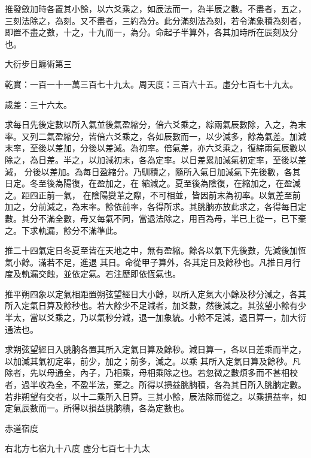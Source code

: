 \begin{pinyinscope}
 推發斂加時各置其小餘，以六爻乘之，如辰法而一，為半辰之數。不盡者，五之，三刻法除之，為刻。又不盡者，三約為分。此分滿刻法為刻，若令滿象積為刻者，即置不盡之數，十之，十九而一，為分。命起子半算外，各其加時所在辰刻及分也。



 大衍步日躔術第三



 乾實：一百一十一萬三百七十九太。周天度：三百六十五。虛分七百七十九太。



 歲差：三十六太。



 求每日先後定數以所入氣並後氣盈縮分，倍六爻乘之，綜兩氣辰數除，入之，為末率。又列二氣盈縮分，皆倍六爻乘之，各如辰數而一，以少減多，餘為氣差。加減末率，至後以差加，分後以差減。為初率。倍氣差，亦六爻乘之，復綜兩氣辰數以除之，為日差。半之，以加減初末，各為定率。以日差累加減氣初定率，至後以差減，
 分後以差加。為每日盈縮分。乃馴積之，隨所入氣日加減氣下先後數，各其日定。冬至後為陽復，在盈加之，在
 縮減之。夏至後為陰復，在縮加之，在盈減之。距四正前一氣，
 在陰陽變革之際，不可相並，皆因前末為初率。以氣差至前加之，分前減之，為末率。餘依前率，各得所求。其朓朒亦放此求之，各得每日定數。其分不滿全數，母又每氣不同，當退法除之，用百為母，半已上從一，已下棄之。下求軌漏，餘分不滿準此。



 推二十四氣定日冬夏至皆在天地之中，無有盈縮。餘各以氣下先後數，先減後加恆氣小餘。滿若不足，進退
 其日。命從甲子算外，各其定日及餘秒也。凡推日月行度及軌漏交蝕，並依定氣。若注歷即依恆氣也。



 推平朔四象以定氣相距置朔弦望經日大小餘，以所入定氣大小餘及秒分減之，各其所入定氣日算及餘秒也。若大餘少不足減者，加爻數，然後減之。其弦望小餘有少半太，當以爻乘之，乃以氣秒分減，退一加象統。小餘不足減，退日算一，加大衍通法也。



 求朔弦望經日入朓朒各置其所入定氣日算及餘秒。減日算一，各以日差乘而半之，以加減其氣初定率，前少，加之；前多，減之。以乘
 其所入定氣日算及餘秒。凡除者，先以母通全，內子，乃相乘，母相乘除之也。若忽微之數煩多而不甚相校者，過半收為全，不盈半法，棄之。所得以損益朓朒積，各為其日所入朓朒定數。若非朔望有交者，以十二乘所入日算。三其小餘，辰法除而從之。以乘損益率，如定氣辰數而一。所得以損益朓朒積，各為定數也。



 赤道宿度



 右北方七宿九十八度
 虛分七百七十九太




\end{pinyinscope}
